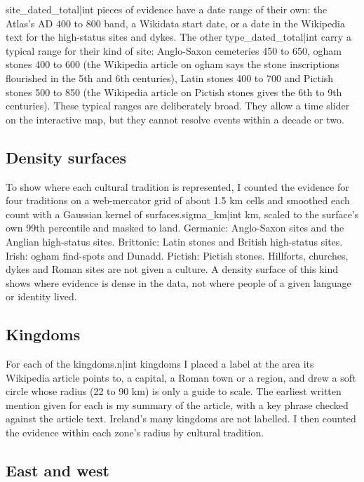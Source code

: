 \documentclass[11pt,a4paper]{article}
\begin{document}
{{site_dated_total|int}} pieces of evidence have a date range of their own: the Atlas's AD 400 to 800 band, a Wikidata start date, or a date in the Wikipedia text for the high-status sites and dykes. The other {{type_dated_total|int}} carry a typical range for their kind of site: Anglo-Saxon cemeteries 450 to 650, ogham stones 400 to 600 (the Wikipedia article on ogham says the stone inscriptions flourished in the 5th and 6th centuries), Latin stones 400 to 700 and Pictish stones 500 to 850 (the Wikipedia article on Pictish stones gives the 6th to 9th centuries). These typical ranges are deliberately broad. They allow a time slider on the interactive map, but they cannot resolve events within a decade or two.

\subsection{Density surfaces}

To show where each cultural tradition is represented, I counted the evidence for four traditions on a web-mercator grid of about 1.5 km cells and smoothed each count with a Gaussian kernel of {{surfaces.sigma_km|int}} km, scaled to the surface's own 99th percentile and masked to land. Germanic: Anglo-Saxon sites and the Anglian high-status sites. Brittonic: Latin stones and British high-status sites. Irish: ogham find-spots and Dunadd. Pictish: Pictish stones. Hillforts, churches, dykes and Roman sites are not given a culture. A density surface of this kind shows where evidence is dense in the data, not where people of a given language or identity lived.

\subsection{Kingdoms}

For each of the {{kingdoms.n|int}} kingdoms I placed a label at the area its Wikipedia article points to, a capital, a Roman town or a region, and drew a soft circle whose radius (22 to 90 km) is only a guide to scale. The earliest written mention given for each is my summary of the article, with a key phrase checked against the article text. Ireland's many kingdoms are not labelled. I then counted the evidence within each zone's radius by cultural tradition.

\subsection{East and west}
\end{document}
